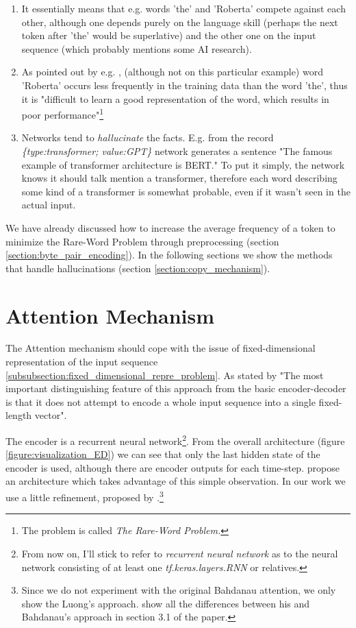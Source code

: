 \begin{enumerate}
    \item It essentially means that e.g. words 'the' and 'Roberta' compete against each other, although one depends purely on the language skill (perhaps the next token after 'the' would be superlative) and the other one on the input sequence (which probably mentions some AI research).
    \item As pointed out by e.g. \citet{gulcehre2016pointing}, (although not on this particular example) word 'Roberta' occurs less frequently in the training data than the word 'the', thus it is "difficult to learn a good representation of the word, which results in poor performance"\footnote{The problem is called \emph{The Rare-Word Problem.}}
    \item Networks tend to \emph{hallucinate} the facts. E.g. from the record \emph{\{type:transfor\-mer; value:GPT\}} network generates a sentence "The famous example of transformer architecture is BERT." To put it simply, the network knows it should talk mention a transformer, therefore each word describing some kind of a transformer is somewhat probable, even if it wasn't seen in the actual input.
\end{enumerate}

We have already discussed how to increase the average frequency of a token to minimize the Rare-Word Problem through preprocessing (section \ref{section:byte_pair_encoding}). In the following sections we show the methods that handle hallucinations (section \ref{section:copy_mechanism}).

\section{Attention Mechanism} \label{section:attention_mechanism}

The Attention mechanism should cope with the issue of fixed-dimensional representation of the input sequence \ref{subsubsection:fixed_dimensional_repre_problem}. As stated by \citet{bahdanau2016neural} "The most important distinguishing feature of this approach from the basic encoder-decoder is that it does not attempt to encode a whole input sequence into a single fixed-length vector".

The encoder is a recurrent neural network\footnote{From now on, I'll stick to refer to \emph{recurrent neural network} as to the neural network consisting of at least one \emph{tf.keras.layers.RNN} or relatives.}. From the overall architecture (figure \ref{figure:visualization_ED}) we can see that only the last hidden state of the encoder is used, although there are encoder outputs for each time-step. \citet{bahdanau2016neural} propose an architecture which takes advantage of this simple observation. In our work we use a little refinement, proposed by \citet{luong2015effective}.\footnote{Since we do not experiment with the original Bahdanau attention, we only show the Luong's approach. \citet{luong2015effective} show all the differences between his and Bahdanau's approach in section 3.1 of the paper.}

